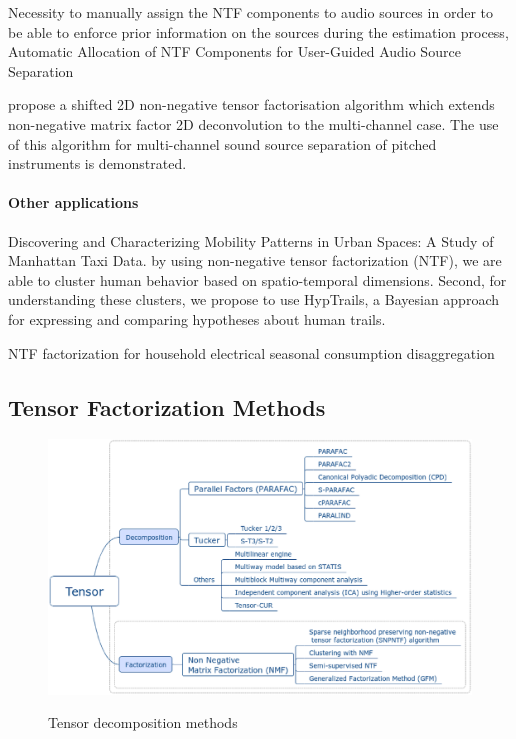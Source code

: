 \documentclass[letterpaper,12pt]{article}
\begin{document}
\cite{Bilen2016} Necessity to manually assign the NTF components to audio sources in order to be able to enforce prior information on the sources during the estimation process, Automatic Allocation of NTF Components for User-Guided Audio Source Separation

\cite{Fitzgerald2006} propose a shifted 2D non-negative tensor factorisation algorithm which extends non-negative matrix factor 2D deconvolution to the multi-channel case. The use of this algorithm for multi-channel sound source separation of pitched instruments is demonstrated.

\paragraph{Other applications}

\cite{Espin-Noboa2016} Discovering and Characterizing Mobility Patterns in Urban Spaces: A Study of Manhattan Taxi Data. by using non-negative tensor factorization (NTF), we are able to cluster human behavior based on spatio-temporal dimensions. Second, for understanding these clusters, we propose to use HypTrails, a Bayesian approach for expressing and comparing hypotheses about human trails.

\cite{Figueiredo2014} NTF factorization for household electrical seasonal consumption disaggregation


\subsection{Tensor Factorization Methods}


\begin{figure}[!ht]
\centering
 \includegraphics[scale=0.5]{Images/tensor_decomposition_methods.eps}\label{fig:methods}
 \caption{Tensor decomposition methods}
\end{figure}
\end{document}
